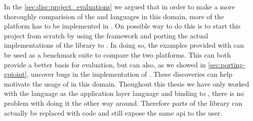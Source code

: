 In the \autoref{sec:disc:project_evaluations} we argued that in order to make a more thoroughly comparision of the {\C} and {\rust} languages in this domain, more of the platform has to be implemented in {\rust}.
On possible way to do this is to start this project from scratch by using the  framework and porting the actual implementations of the {\emlib} library to {\rust}.
In doing so, the examples provided with {\emlib} can be used as a benchmark suite to compare the two platforms.
This can both provide a better basis for evaluation, but can also, as we showed in \autoref{sec:porting-gpioint}, uncover bugs in the {\C} implementation of {\emlib}.
These discoveries can help motivate the usage of {\rust} in this domain.
Thoughout this thesis we have only worked with the {\rust} language as the application layer language and binding to {\C}, there is no problem with doing it the other way around.
Therefore parts of the {\emlib} library can actually be replaced with {\rust} code and still expose the same \gls{api} to the user.
